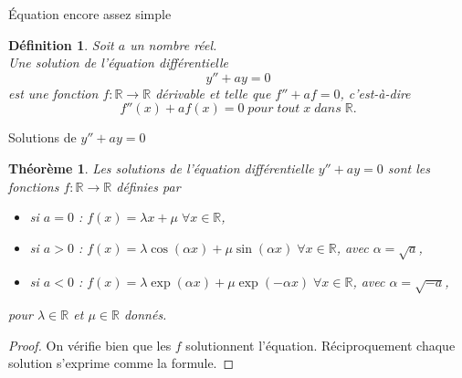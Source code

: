 \documentclass[11pt]{beamer}
\newtheorem{dfn}{Définition}
\newtheorem{thm}{Théorème}
\begin{document}
\begin{frame}{Équation encore assez simple}
\begin{dfn}
Soit $a$ un nombre réel.\\
Une solution de l'équation différentielle 
$$y''+ay=0$$
est une fonction $f:\mathbb{R}\rightarrow\mathbb{R}$ dérivable et telle que $f''+af=0$, c'est-à-dire
$$f''(x)+af(x)=0 \; pour\; tout\; x\; dans \; \mathbb{R}.$$ 
\end{dfn}
\end{frame}
\begin{frame}{Solutions de $y''+ay=0$}
\begin{thm}
Les solutions de l'équation différentielle $y''+ay=0$ sont les fonctions $f:\mathbb{R}\rightarrow\mathbb{R}$ définies par 
\begin{itemize}
\item si $a=0$ : 
$f(x)=\lambda x +\mu\; \forall x \in \mathbb{R}$, 
\item si $a>0$ : 
$f(x)=\lambda \cos(\alpha x )+\mu \sin(\alpha x )\; \forall x \in \mathbb{R}$,
 avec $\alpha=\sqrt{a}$,
\item si $a<0$ :
$f(x)=\lambda \exp(\alpha x) +\mu \exp(-\alpha x) \; \forall x \in \mathbb{R}$,
 avec $\alpha=\sqrt{-a}$,

\end{itemize}
pour $\lambda\in\mathbb{R}$ et $\mu\in\mathbb{R}$ donnés.

\end{thm}
\begin{proof}
On vérifie bien que les $f$ solutionnent l'équation.
Réciproquement chaque solution s'exprime comme la formule.
\end{proof}

\end{frame}

\end{document}

